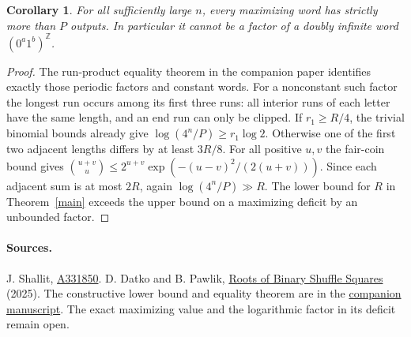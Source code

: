 \documentclass[11pt,letterpaper]{article}
\newtheorem{corollary}[theorem]{Corollary}
\newcommand{\oeis}[1]{\href{https://oeis.org/A#1}{A#1}}
\begin{document}
\begin{corollary}
For all sufficiently large \(n\), every maximizing word has strictly more than \(P\) outputs. In particular it cannot be a factor of a doubly infinite word \((0^a1^b)^{\mathbb Z}\).
\end{corollary}
\begin{proof}
The run-product equality theorem in the companion paper identifies exactly those periodic factors and constant words. For a nonconstant such factor the longest run occurs among its first three runs: all interior runs of each letter have the same length, and an end run can only be clipped. If \(r_1\ge R/4\), the trivial binomial bounds already give \(\log(4^n/P)\ge r_1\log 2\). Otherwise one of the first two adjacent lengths differs by at least \(3R/8\). For all positive \(u,v\) the fair-coin bound gives
\(\binom{u+v}{u}\le2^{u+v}\exp(-(u-v)^2/(2(u+v)))\). Since each adjacent sum is at most \(2R\), again \(\log(4^n/P)\gg R\). The lower bound for \(R\) in Theorem~\ref{main} exceeds the upper bound on a maximizing deficit by an unbounded factor.
\end{proof}

\paragraph{Sources.}
J. Shallit, \oeis{331850}. D. Datko and B. Pawlik, \href{https://doi.org/10.3390/sym17020305}{Roots of Binary Shuffle Squares} (2025). The constructive lower bound and equality theorem are in the \href{https://github.com/blakestone-x/math/blob/c92ab48c98acba51cb42ceb73536a7bad251ec2d/A193020/self-shuffles.pdf}{companion manuscript}. The exact maximizing value and the logarithmic factor in its deficit remain open.
\end{document}
